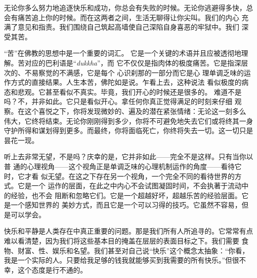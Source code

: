 无论你多么努力地追逐快乐和成功，你总会有失败的时候。无论你逃避得多快，总
会有痛苦追上你的时候。而在这两者之间，生活\1无聊得让你尖叫。我们的内心
充满了意见和指责。我们围绕自己筑起高墙使自己深陷自身喜恶的牢狱中。我们
深受其苦。

“苦”在佛教的思想中是一个重要的词汇。
它是一个关键的术语并且应被透彻地理解。苦对应的巴利语是“{\it dukkha}\/”，而
它不仅仅是指肉体的极度痛苦。它是指深层次的、不易察觉的不满感，它是每个
心识刹那的一部分而它是心
理单调乏味的运作方式的直接结果。人生本苦，佛陀如是说。乍看上去，这种说法
看似极度的病态和悲观。它甚至看似不真实。毕竟，我们开心的时候还是很多的。
难道不是吗？不，并非如此。它只是看似开心。拿任何你真正觉得满足的时刻来仔细
观察。在这个喜悦之下，你将发现微妙的、遍及的潜在紧张情绪：无论这一刻多么
伟大，它终将结束。无论你刚刚得到多少，你将不可避免地失去它们或将终其一身
守护所得和谋划得到更多。而最终，你将面临死亡，你终将失去一切。这一切只是
昙花一现。

听上去非常无望，不是吗？庆幸的是，它并非如此——完全不是这样。只有当你以普
通的心理视角——这个视角正是单调乏味的心理机制运作的角度——看待它时，它才看
似无望。在这之下存在另一个视角，一个完全不同的看待世界的方式。它是一个
运作的层面，在此之中内心不会试图凝固时间，不会执著于流动中的经验，也不会
阻断和忽略它们。它是一个超越好坏，超越乐苦的经验层面。它是一个感知世界的
美妙方式，而且它是一个可以习得的技巧。它虽然不容易，但是可以学会。

快乐和平静是人类存在中真正重要的问题。那是我们所有人所追寻的。它常常有点
难以\1看清楚，因为我们将这些基本目的掩盖在层层的表面目标之下。我们需要
食物、财富、性、娱乐和名望。我们甚至对自己说“快乐”这个概念太抽象：“你看，
我是一个实际的人。只要给我足够的钱我就能够买到我需要的所有快乐。”但很不
幸，这个态度是行不通的。

\endchapter

\vfill\eject\byebye
